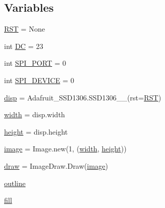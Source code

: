 \subsection*{Variables}
\begin{DoxyCompactItemize}
\item 
\mbox{\hyperlink{namespacetoxic__hardware_1_1oled__interface_a863726b0bb3ebab40dfafb7dd98fd967}{R\+ST}} = None
\item 
int \mbox{\hyperlink{namespacetoxic__hardware_1_1oled__interface_adf756c0d3f22b55d2448ba7589ef6f60}{DC}} = 23
\item 
int \mbox{\hyperlink{namespacetoxic__hardware_1_1oled__interface_a828b6ed6d5ac147569b4e82a5e83135f}{S\+P\+I\+\_\+\+P\+O\+RT}} = 0
\item 
int \mbox{\hyperlink{namespacetoxic__hardware_1_1oled__interface_a9752681a2c24c6bba2ea3e38cf0731e5}{S\+P\+I\+\_\+\+D\+E\+V\+I\+CE}} = 0
\item 
\mbox{\hyperlink{namespacetoxic__hardware_1_1oled__interface_a79f95b96493be8450d34d9d1d12b6398}{disp}} = Adafruit\+\_\+\+S\+S\+D1306.\+S\+S\+D1306\+\_\+\_(rst=\mbox{\hyperlink{namespacetoxic__hardware_1_1oled__interface_a863726b0bb3ebab40dfafb7dd98fd967}{R\+ST}})
\item 
\mbox{\hyperlink{namespacetoxic__hardware_1_1oled__interface_a4a60f1ea9d94d7defd7e96d957f6d35d}{width}} = disp.\+width
\item 
\mbox{\hyperlink{namespacetoxic__hardware_1_1oled__interface_a04ce862db440b383129c968ecb0651c6}{height}} = disp.\+height
\item 
\mbox{\hyperlink{namespacetoxic__hardware_1_1oled__interface_adaad3157e9032049ecca2c4ee24cfdb8}{image}} = Image.\+new(\textquotesingle{}1\textquotesingle{}, (\mbox{\hyperlink{namespacetoxic__hardware_1_1oled__interface_a4a60f1ea9d94d7defd7e96d957f6d35d}{width}}, \mbox{\hyperlink{namespacetoxic__hardware_1_1oled__interface_a04ce862db440b383129c968ecb0651c6}{height}}))
\item 
\mbox{\hyperlink{namespacetoxic__hardware_1_1oled__interface_a6b3585c5a31faea000d6630399894c0c}{draw}} = Image\+Draw.\+Draw(\mbox{\hyperlink{namespacetoxic__hardware_1_1oled__interface_adaad3157e9032049ecca2c4ee24cfdb8}{image}})
\item 
\mbox{\hyperlink{namespacetoxic__hardware_1_1oled__interface_aaeac32a54a5c8dbb7b165484dd3ff515}{outline}}
\item 
\mbox{\hyperlink{namespacetoxic__hardware_1_1oled__interface_a6249580750b8516240d739a5bd55a3c6}{fill}}
\item 

\end{DoxyCompactItemize}
